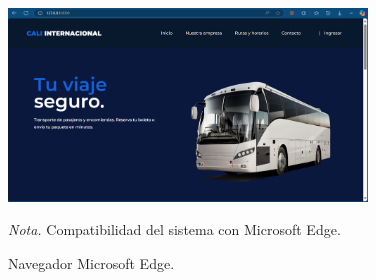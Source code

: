 \begin{figure}[!h] %
	\caption[Navegador Microsoft Edge]
	{\newline Navegador Microsoft Edge.} %
	\centering
	\includegraphics[width=0.85\textwidth]{imagenes/cap_3/edge.png} %
	
	\begin{flushleft}
		\hspace{1.20cm} \textit{Nota.} Compatibilidad del sistema con Microsoft Edge. %
	\end{flushleft}
	\vspace{16pt}
	\label{fig:figura_edge} %
\end{figure}


